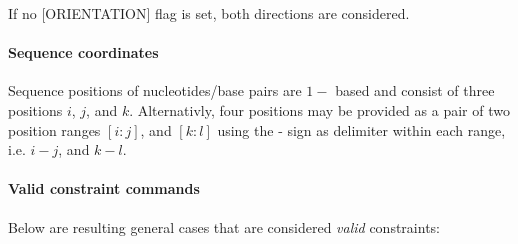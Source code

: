 If no {\ttfamily }\mbox{[}O\+R\+I\+E\+N\+T\+A\+T\+I\+ON\mbox{]} flag is set, both directions are considered.\hypertarget{file_formats_const_file_seq_coords}{}\paragraph{Sequence coordinates}\label{file_formats_const_file_seq_coords}
Sequence positions of nucleotides/base pairs are $ 1- $ based and consist of three positions $ i $, $ j $, and $ k $. Alternativly, four positions may be provided as a pair of two position ranges $ [i:j] $, and $ [k:l] $ using the \textquotesingle{}-\/\textquotesingle{} sign as delimiter within each range, i.\+e. $ i-j $, and $ k-l $.\hypertarget{file_formats_const_file_syntax}{}\paragraph{Valid constraint commands}\label{file_formats_const_file_syntax}
Below are resulting general cases that are considered {\itshape valid} constraints\+:



